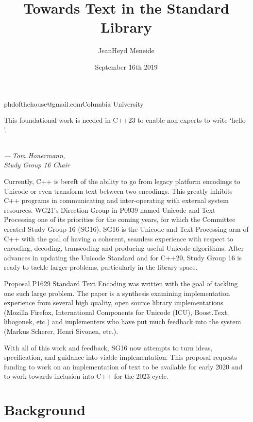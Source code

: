 \documentclass{wg21}
\begin{document}
\title{Towards Text in the Standard Library}
\author{JeanHeyd Meneide}{phdofthehouse@gmail.com}{Columbia University}
\date{September 16th 2019}

\maketitle

\epigraph{This foundational work is needed in C++23 to enable non-experts to write ‘hello ’.}{\textit{\\— Tom Honermann,\\Study Group 16 Chair}}

Currently, C++ is bereft of the ability to go from legacy platform encodings to Unicode or even transform text between two encodings. This greatly inhibits C++ programs in communicating and inter-operating with external system resources. WG21's Direction Group in P0939 named Unicode and Text Processing one of its priorities for the coming years\cite{p0939}, for which the Committee created Study Group 16 (SG16). SG16 is the Unicode and Text Processing arm of C++ with the goal of having a coherent, seamless experience with respect to encoding, decoding, transcoding and producing useful Unicode algorithms. After advances in updating the Unicode Standard\cite{p1025} and \cite{p0482} for C++20, Study Group 16 is ready to tackle larger problems, particularly in the library space.

Proposal P1629 Standard Text Encoding\cite{p1629} was written with the goal of tackling one such large problem. The paper is a synthesis examining implementation experience from several high quality, open source library implementations (Mozilla Firefox, International Components for Unicode (ICU)\cite{icu}, Boost.Text\cite{boost.text}, libogonek\cite{libogonek}, etc.) and implementers who have put much feedback into the system (Markus Scherer, Henri Sivonen, etc.).

With all of this work and feedback\cite{p1629_feedback}, SG16 now attempts to turn ideas, specification, and guidance into viable implementation. This proposal requests funding to work on an implementation of text to be available for early 2020 and to work towards inclusion into C++ for the 2023 cycle.


\section[background]{Background}
\end{document}
